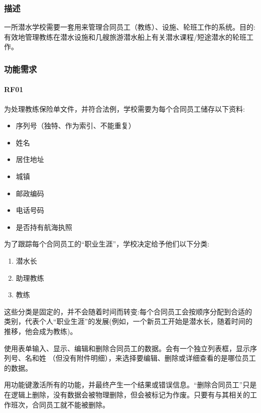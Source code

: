 \hypertarget{ux63cfux8ff0}{%
\subsubsection{描述}\label{ux63cfux8ff0}}

一所潜水学校需要一套用来管理合同员工（教练）、设施、轮班工作的系统。目的:有效地管理教练在潜水设施和几艘旅游潜水船上有关潜水课程/短途潜水的轮班工作。

\hypertarget{ux529fux80fdux9700ux6c42}{%
\subsubsection{功能需求}\label{ux529fux80fdux9700ux6c42}}

\hypertarget{rf01}{%
\paragraph{RF01}\label{rf01}}

为处理教练保险单文件，并符合法例，学校需要为每个合同员工储存以下资料:

\begin{itemize}
\tightlist
\item
  序列号（独特、作为索引、不能重复）
\item
  姓名
\item
  居住地址
\item
  城镇
\item
  邮政编码
\item
  电话号码
\item
  是否持有航海执照
\end{itemize}

为了跟踪每个合同员工的``职业生涯''，学校决定给予他们以下分类:

\begin{enumerate}
\tightlist
\item
  潜水长
\item
  助理教练
\item
  教练
\end{enumerate}

这些分类是固定的，并不会随着时间而转变:每个合同员工会按顺序分配到合适的类别，代表个人``职业生涯''的发展(例如，一个新员工开始是潜水长，随着时间的推移，他会成为教练)。

使用表单输入、显示、编辑和删除合同员工的数据。会有一个独立列表框，显示序列号、名和姓
（但没有附件明细），来选择要编辑、删除或详细查看的是哪位员工的数据。

用功能键激活所有的功能，并最终产生一个结果或错误信息。``删除合同员工''只是在逻辑上删除，没有数据会被物理删除，但会被标记为作废。只要有与其相关的工作班次，合同员工就不能被删除。

